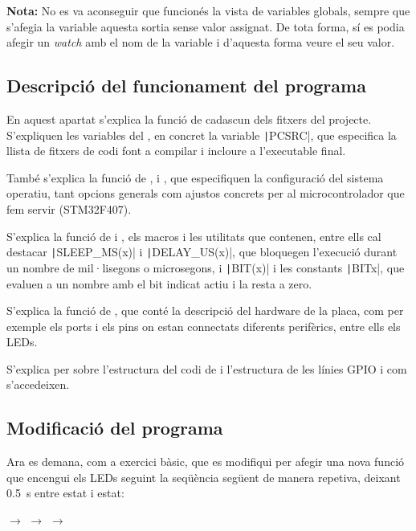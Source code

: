 \textbf{Nota:} No es va aconseguir que funcionés la vista de variables globals, sempre que
s'afegia la variable aquesta sortia sense valor assignat. De tota forma, sí es podia afegir
un \emph{watch} amb el nom de la variable i d'aquesta forma veure el seu valor.


\subsection{Descripció del funcionament del programa}

En aquest apartat s'explica la funció de cadascun dels fitxers del projecte. S'expliquen les variables
del , en concret la variable \texttt|PCSRC|, que especifica la llista
de fitxers de codi font a compilar i incloure a l'executable final.

També s'explica la funció de ,  i ,
que especifiquen la configuració del sistema operatiu, tant opcions generals com ajustos concrets
per al microcontrolador que fem servir (STM32F407).

S'explica la funció de  i , els macros i les utilitats que contenen,
entre ells cal destacar \texttt|SLEEP_MS(x)| i \texttt|DELAY_US(x)|, que bloquegen
l'execució durant un nombre de mil·lisegons o microsegons, i \texttt|BIT(x)| i les constants
\texttt|BITx|, que evaluen a un nombre amb el bit indicat actiu i la resta a zero.

S'explica la funció de , que conté la descripció del hardware de la placa,
com per exemple els ports i els pins on estan connectats diferents perifèrics, entre ells els LEDs.

S'explica per sobre l'estructura del codi de  i l'estructura de les línies GPIO
i com s'accedeixen.


\subsection{Modificació del programa}

Ara es demana, com a exercici bàsic, que es modifiqui  per afegir una nova funció
 que encengui els LEDs seguint la seqüència següent de manera repetiva, deixant
\SI{0.5}{\second} entre estat i estat:

\begin{center}
 $\rightarrow$
 $\rightarrow$
 $\rightarrow$
\end{center}

